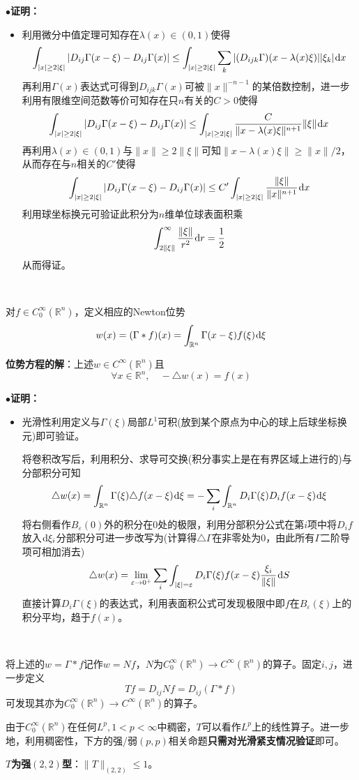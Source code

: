 \documentclass[a4paper,UTF8,fontset=windows,AutoFakeBold]{ctexart}
\newcommand*{\dr}{\hspace{0.07em}\mathrm{d}}
\newcommand{\proo}[1]{{\kaishu $\bullet$\textbf{证明：}
\begin{itemize}
    \item[] #1
\end{itemize}
}}
\begin{document}
\proo{
    利用微分中值定理可知存在$\lambda(x)\in(0,1)$使得
    $$\int_{|x|\ge2|\xi|}|D_{ij}\Gamma(x-\xi)-D_{ij}\Gamma(x)|\le\int_{|x|\ge2|\xi|}\sum_k|(D_{ijk}\Gamma)(x-\lambda(x)\xi)||\xi_k|\dr x$$
    再利用$\Gamma(x)$表达式可得到$D_{ijk}\Gamma(x)$可被$\|x\|^{-n-1}$的某倍数控制，进一步利用有限维空间范数等价可知存在只$n$有关的$C>0$使得
    $$\int_{|x|\ge2|\xi|}|D_{ij}\Gamma(x-\xi)-D_{ij}\Gamma(x)|\le\int_{|x|\ge2|\xi|}\frac{C}{\|x-\lambda(x)\xi\|^{n+1}}\|\xi\|\dr x$$
    再利用$\lambda(x)\in(0,1)$与$\|x\|\ge2\|\xi\|$可知$\|x-\lambda(x)\xi\|\ge\|x\|/2$，从而存在与$n$相关的$C'$使得
    $$\int_{|x|\ge2|\xi|}|D_{ij}\Gamma(x-\xi)-D_{ij}\Gamma(x)|\le C'\int_{|x|\ge2|\xi|}\frac{\|\xi\|}{\|x\|^{n+1}}\dr x$$
    利用球坐标换元可验证此积分为$n$维单位球表面积乘
    $$\int_{2\|\xi\|}^\infty\frac{\|\xi\|}{r^2}\dr r=\frac{1}{2}$$
    从而得证。
}

\

对$f\in C_0^\infty(\mathbb{R}^n)$，定义相应的Newton位势
$$w(x)=(\Gamma*f)(x)=\int_{\mathbb{R}^n}\Gamma(x-\xi)f(\xi)\dr\xi$$

\textbf{位势方程的解}：上述$w\in C^\infty(\mathbb{R}^n)$且
$$\forall x\in\mathbb{R}^n,\quad -\triangle w(x)=f(x)$$
\proo{
    光滑性利用定义与$\Gamma(\xi)$局部$L^1$可积(放到某个原点为中心的球上后球坐标换元)即可验证。

    将卷积改写后，利用积分、求导可交换(积分事实上是在有界区域上进行的)与分部积分可知
    $$\triangle w(x)=\int_{\mathbb{R}^n}\Gamma(\xi)\triangle f(x-\xi)\dr\xi=-\sum_i\int_{\mathbb{R}^n}D_i\Gamma(\xi)D_if(x-\xi)\dr\xi$$
    将右侧看作$B_\varepsilon(0)$外的积分在0处的极限，利用分部积分公式在第$i$项中将$D_if$放入$\dr\xi_i$分部积分可进一步改写为(计算得$\triangle\Gamma$在非零处为0，由此所有$\Gamma$二阶导项可相加消去)
    $$\triangle w(x)=\lim_{\varepsilon\to 0^+}\sum_i\int_{|\xi|=\varepsilon}D_i\Gamma(\xi)f(x-\xi)\frac{\xi_i}{\|\xi\|}\dr S$$
    直接计算$D_i\Gamma(\xi)$的表达式，利用表面积公式可发现极限中即$f$在$B_\varepsilon(\xi)$上的积分平均，趋于$f(x)$。
}

\

将上述的$w=\Gamma*f$记作$w=Nf$，$N$为$C_0^\infty(\mathbb{R}^n)\to C^\infty(\mathbb{R}^n)$的算子。固定$i,j$，进一步定义
$$Tf=D_{ij}Nf=D_{ij}(\Gamma*f)$$
可发现其亦为$C_0^\infty(\mathbb{R}^n)\to C^\infty(\mathbb{R}^n)$的算子。

由于$C_0^\infty(\mathbb{R}^n)$在任何$L^p,1<p<\infty$中稠密，$T$可以看作$L^p$上的线性算子。进一步地，利用稠密性，下方的强/弱$(p,p)$相关命题\textbf{只需对光滑紧支情况验证}即可。

\textbf{$T$为强$(2,2)$型}：$\|T\|_{(2,2)}\le1$。
\end{document}
